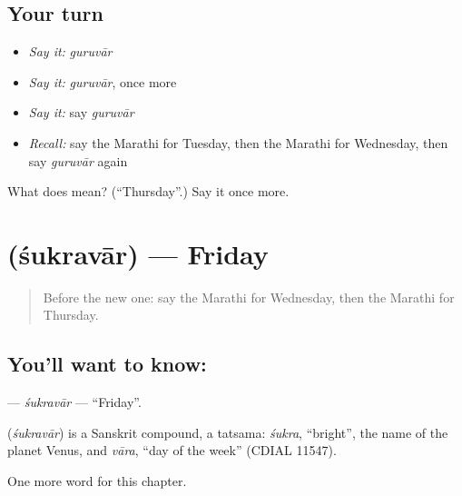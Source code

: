 \subsection*{Your turn}
\begin{itemize}
\raggedright
  \item \emph{Say it:} \emph{guruvār}
  \item \emph{Say it:} \emph{guruvār}, once more
  \item \emph{Say it:} say \emph{guruvār}
  \item \emph{Recall:} say the Marathi for Tuesday, then the Marathi for Wednesday, then say \emph{guruvār} again
\end{itemize}

\begin{tcolorbox}[breakable,colback=teal!4,colframe=teal!35!black,title={Before you move on}]
What does  mean? (\textquotedblleft{}Thursday\textquotedblright{}.) Say it once more.
\end{tcolorbox}
\section[\texorpdfstring{\mr{शुक्रवार} (śukravār)}{शुक्रवार (śukravār)}]{ (śukravār) — Friday}

\label{lesson:MR-C125-sukravar}



\begin{quote}
Before the new one: say the Marathi for Wednesday, then the Marathi for Thursday.
\end{quote}

\subsection*{You'll want to know: }
\textbf{} — \emph{śukravār} — \textquotedblleft{}Friday\textquotedblright{}.

\begin{cousinweb}
\textbf{} (\emph{śukravār}) is a Sanskrit compound, a tatsama: \emph{śukra}, \textquotedblleft{}bright\textquotedblright{}, the name of the planet Venus, and \emph{vāra}, \textquotedblleft{}day of the week\textquotedblright{} (CDIAL 11547).
\end{cousinweb}

\begin{grammarlens}[title={What you've built}]
One more word for this chapter.
\end{grammarlens}


